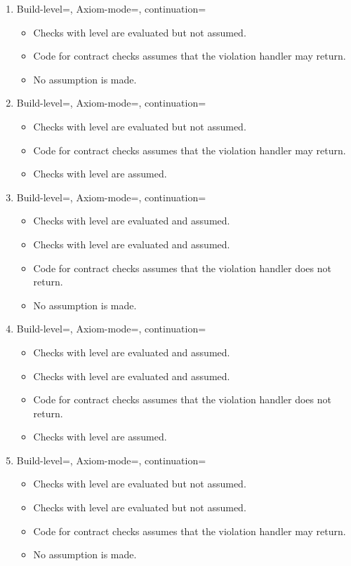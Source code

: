 \begin{enumerate}
\item Build-level=, Axiom-mode=, continuation=
\begin{itemize}
  \item Checks with  level are evaluated but not assumed.
  \item Code for contract checks assumes that the violation handler may return.
  \item No assumption is made.
\end{itemize}

\item Build-level=, Axiom-mode=, continuation=
\begin{itemize}
  \item Checks with  level are evaluated but not assumed.
  \item Code for contract checks assumes that the violation handler may return.
  \item Checks with  level are assumed.
\end{itemize}

\item Build-level=, Axiom-mode=, continuation=
\begin{itemize}
  \item Checks with  level are evaluated and assumed.
  \item Checks with  level are evaluated and assumed.
  \item Code for contract checks assumes that the violation handler does not return.
  \item No assumption is made.
\end{itemize}

\item Build-level=, Axiom-mode=, continuation=
\begin{itemize}
  \item Checks with  level are evaluated and assumed.
  \item Checks with  level are evaluated and assumed.
  \item Code for contract checks assumes that the violation handler does not return.
  \item Checks with  level are assumed.
\end{itemize}

\item Build-level=, Axiom-mode=, continuation=
\begin{itemize}
  \item Checks with  level are evaluated but not assumed.
  \item Checks with  level are evaluated but not assumed.
  \item Code for contract checks assumes that the violation handler may return.
  \item No assumption is made.
\end{itemize}


\end{enumerate}
